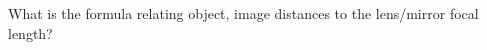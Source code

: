 

\vspace*{\fill}
\centering

What is the formula relating object, image distances to the lens/mirror focal length?

\centering
\vspace*{\fill}

